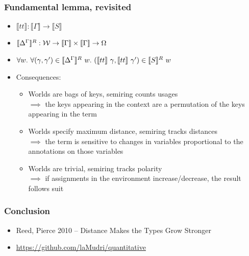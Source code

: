 \documentclass{beamer}
\begin{document}
  \begin{frame}
    \frametitle{Fundamental lemma, revisited}
    \begin{itemize}
    \item $\llbracket tt \rrbracket : \llbracket \Gamma \rrbracket \to
      \llbracket S \rrbracket$
    \item $\llbracket {\Delta}^{\Gamma} \rrbracket^R : \mathcal{W} \to
      \llbracket \Gamma \rrbracket \times \llbracket \Gamma \rrbracket \to \Omega$
    \item $\forall w.~\forall(\gamma, \gamma') \in \llbracket {\Delta}^{\Gamma}
      \rrbracket^R~w.~(\llbracket tt \rrbracket~\gamma, \llbracket tt
      \rrbracket~\gamma') \in \llbracket S \rrbracket^R~w$
    \item Consequences:
      \begin{itemize}
      \item Worlds are bags of keys, semiring counts usages \\
        $\implies$ the keys appearing in the context are a permutation of the
        keys appearing in the term
      \item Worlds specify maximum distance, semiring tracks distances \\
        $\implies$ the term is sensitive to changes in variables proportional to
        the annotations on those variables
      \item Worlds are trivial, semiring tracks polarity \\
        $\implies$ if assignments in the environment increase/decrease, the
        result follows suit
      \end{itemize}
    \end{itemize}
  \end{frame}
  \begin{frame}
    \frametitle{Conclusion}
    \begin{itemize}
    \item Reed, Pierce 2010 -- Distance Makes the Types Grow Stronger
    \item \url{https://github.com/laMudri/quantitative}
    \end{itemize}
  \end{frame}
\end{document}
